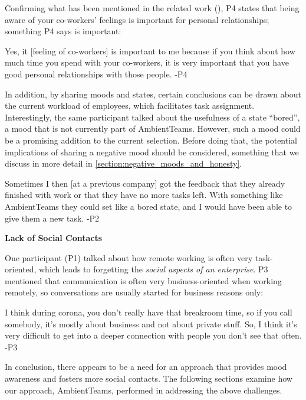 Confirming what has been mentioned in the related work (\autocite{grant2013exploration, kuwabara2002connectedness}), P4 states that being aware of your co-workers' feelings is important for personal relationships; something P4 says is important:

\begin{displayquote}
    Yes, it [feeling of co-workers] is important to me because if you think about how much time you spend with your co-workers, it is very important that you have good personal relationships with those people. -P4
\end{displayquote}

In addition, by sharing moods and states, certain conclusions can be drawn about the current workload of employees, which facilitates task assignment. Interestingly, the same participant talked about the usefulness of a state \enquote{bored}, a mood that is not currently part of AmbientTeams. However, such a mood could be a promising addition to the current selection. Before doing that, the potential implications of sharing a negative mood should be considered, something that we discuss in more detail in \autoref{section:negative_moods_and_honesty}.

\begin{displayquote}
    Sometimes I then [at a previous company] got the feedback that they already finished with work or that they have no more tasks left. With something like AmbientTeams they could set like a bored state, and I would have been able to give them a new task. -P2
\end{displayquote}

\bigskip\noindent\textbf{Lack of Social Contacts}

\medskip\noindent One participant (P1) talked about how remote working is often very task-oriented, which leads to forgetting the \textit{social aspects of an enterprise}. P3 mentioned that communication is often very business-oriented when working remotely, so conversations are usually started for business reasons only:

\begin{displayquote}
    I think during corona, you don't really have that breakroom time, so if you call somebody, it's mostly about business and not about private stuff. So, I think it's very difficult to get into a deeper connection with people you don't see that often. -P3
\end{displayquote}

In conclusion, there appears to be a need for an approach that provides mood awareness and fosters more social contacts. The following sections examine how our approach, AmbientTeams, performed in addressing the above challenges.

